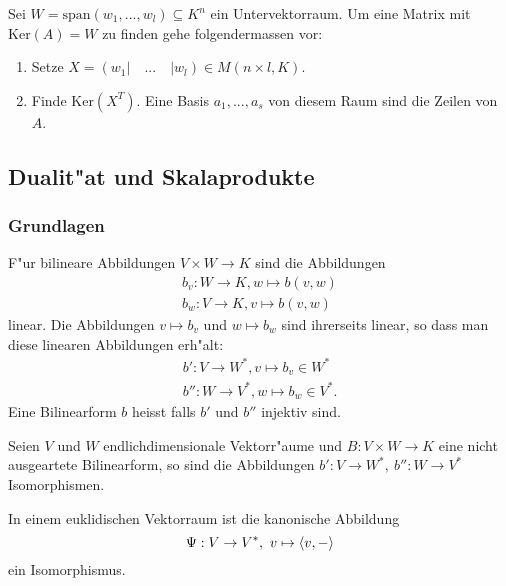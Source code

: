 \documentclass[8pt, a4paper, twocolumn, landscape]{article}
\begin{document}
\begin{remark}
Sei $W = \mathrm{span}(w_1, ..., w_l) \subseteq K^n$ ein Untervektorraum. Um eine Matrix mit $\mathrm{Ker}(A) = W$ zu finden gehe folgendermassen vor:
\begin{enumerate}
\item Setze $X = (w_1| \quad ... \quad | w_l) \in M(n \times l, K)$.
\item Finde $\mathrm{Ker}(X^T)$. Eine Basis $a_1, ..., a_s$ von diesem Raum sind die Zeilen von $A$.
\end{enumerate}
\end{remark}

\subsection{Dualit"at und Skalaprodukte}
\subsubsection{Grundlagen}
\begin{definition}
F"ur bilineare Abbildungen $V \times W \rightarrow K$ sind die Abbildungen
\begin{gather*}
b_v : W \rightarrow K, w \mapsto b(v, w)\\
b_w : V \rightarrow K, v \mapsto b(v, w)
\end{gather*}
linear. Die Abbildungen $v \mapsto b_v$ und $w \mapsto b_w$ sind ihrerseits linear, so dass man diese linearen Abbildungen erh"alt:
\begin{gather*}
b ' : V \rightarrow W^*, v \mapsto b_v \in W^* \\
b '' : W \rightarrow V^*, w \mapsto b_w \in V^*. 
\end{gather*}
Eine Bilinearform $b$ heisst  falls $b'$ und $b''$ injektiv sind.
\end{definition}

\begin{theorem}
Seien $V$ und $W$ endlichdimensionale Vektorr"aume und $B : V \times W \rightarrow K$ eine nicht ausgeartete Bilinearform, so sind die Abbildungen 
$
b': V \rightarrow W^*, \ b'':W \rightarrow V^*
$
Isomorphismen.
\end{theorem}



\begin{corollary}
In einem euklidischen Vektorraum ist die kanonische Abbildung
$$
\Psi : V \rightarrow V^*, \ 
v \mapsto \scp{v}{-}
$$
ein Isomorphismus.
\end{corollary}
\end{document}
